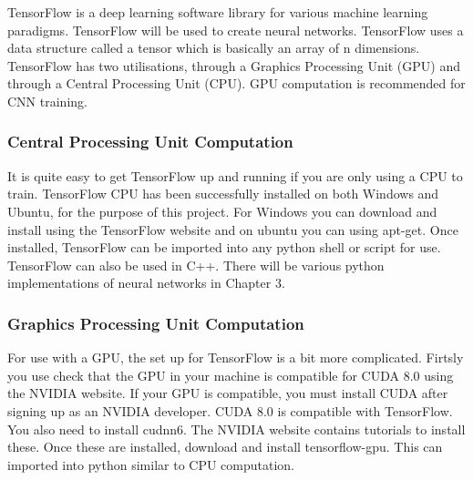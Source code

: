 TensorFlow is a deep learning software library for various machine learning paradigms. TensorFlow will be used to create neural networks.
TensorFlow uses a data structure called a tensor which is basically an array of n dimensions.
TensorFlow has two utilisations, through a Graphics Processing Unit (GPU) and through a Central Processing Unit (CPU).
GPU computation is recommended for CNN training. 

\subsubsection*{Central Processing Unit Computation}
It is quite easy to get TensorFlow up and running if you are only using a CPU to
train. TensorFlow CPU has been successfully installed on both Windows and Ubuntu, for the purpose of this project.
For Windows you can download and install using the TensorFlow website and on ubuntu you can
using apt-get. Once installed, TensorFlow can be imported into any python shell
or script for use. TensorFlow can also be used in C++. There will be various
python implementations of neural networks in Chapter 3.

\subsubsection*{Graphics Processing Unit Computation}
For use with a GPU, the set up for TensorFlow is a bit more complicated. Firtsly
you use check that the GPU in your machine is compatible for CUDA 8.0 using the
NVIDIA website. If your GPU is compatible, you must install CUDA after signing
up as an NVIDIA developer. CUDA 8.0 is compatible with TensorFlow. You also need
to install cudnn6. The NVIDIA website contains tutorials to install these. Once
these are installed, download and install tensorflow-gpu. This can imported into
python similar to CPU computation.
